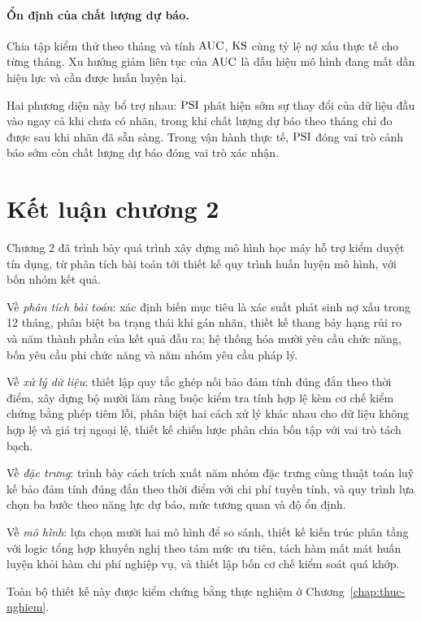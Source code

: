 \paragraph{Ổn định của chất lượng dự báo.} Chia tập kiểm thử theo tháng và tính
$\mathrm{AUC}$, $\mathrm{KS}$ cùng tỷ lệ nợ xấu thực tế cho từng tháng. Xu hướng giảm liên tục
của $\mathrm{AUC}$ là dấu hiệu mô hình đang mất dần hiệu lực và cần được huấn luyện lại.

Hai phương diện này bổ trợ nhau: $\mathrm{PSI}$ phát hiện sớm sự thay đổi của dữ liệu đầu
vào ngay cả khi chưa có nhãn, trong khi chất lượng dự báo theo tháng chỉ đo được
sau khi nhãn đã sẵn sàng. Trong vận hành thực tế, $\mathrm{PSI}$ đóng vai trò cảnh báo
sớm còn chất lượng dự báo đóng vai trò xác nhận.

\section*{Kết luận chương 2}

Chương 2 đã trình bày quá trình xây dựng mô hình học máy hỗ trợ kiểm duyệt tín
dụng, từ
phân tích bài toán tới thiết kế quy trình huấn luyện mô hình, với bốn nhóm kết
quả.

Về \textit{phân tích bài toán}: xác định biến mục tiêu là xác suất phát sinh nợ
xấu trong 12 tháng, phân biệt ba trạng thái khi gán nhãn, thiết kế thang bảy hạng
rủi ro và năm thành phần của kết quả đầu ra; hệ thống hóa mười yêu cầu chức năng,
bốn yêu cầu phi chức năng và năm nhóm yêu cầu pháp lý.

Về \textit{xử lý dữ liệu}: thiết lập quy tắc ghép nối bảo đảm tính đúng đắn theo
thời điểm, xây dựng bộ mười lăm ràng buộc kiểm tra tính hợp lệ kèm cơ chế kiểm
chứng bằng phép tiêm lỗi, phân biệt hai cách xử lý khác nhau cho dữ liệu không
hợp lệ và giá trị ngoại lệ, thiết kế chiến lược phân chia bốn tập với vai trò
tách bạch.

Về \textit{đặc trưng}: trình bày cách trích xuất năm nhóm đặc trưng cùng thuật
toán luỹ kế bảo đảm tính đúng đắn theo thời điểm với chi phí tuyến tính, và quy
trình lựa chọn ba bước theo năng lực dự báo, mức tương quan và độ ổn định.

Về \textit{mô hình}: lựa chọn mười hai mô hình để so sánh, thiết kế kiến trúc
phân tầng với logic tổng hợp khuyến nghị theo tám mức ưu tiên, tách hàm mất mát
huấn luyện khỏi hàm chi phí nghiệp vụ, và thiết lập bốn cơ chế kiểm soát quá
khớp.

Toàn bộ thiết kế này được kiểm chứng bằng thực nghiệm ở
Chương~\ref{chap:thuc-nghiem}.
